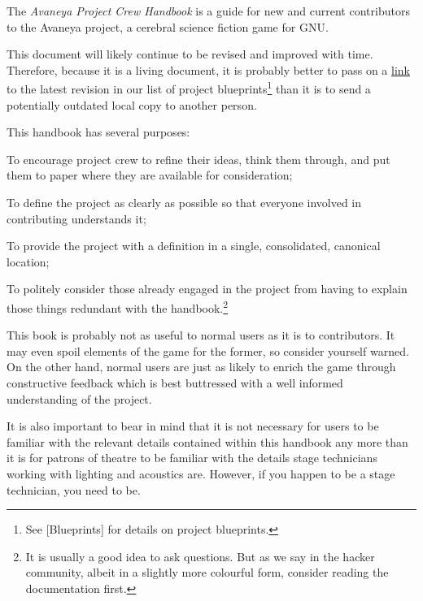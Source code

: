 

The {\it Avaneya Project Crew Handbook} is a guide for new and current contributors to the Avaneya project, a cerebral science fiction game for GNU. 

This document will likely continue to be revised and improved with time. Therefore, because it is a living document, it is probably better to pass on a \href{\LatestHandbookURL}{link} to the latest revision in our list of project blueprints\footnote[]{See [Blueprints] for details on project blueprints.} than it is to send a potentially outdated local copy to another person.

This handbook has several purposes:

\startitemize[4]
\item
To encourage project crew to refine their ideas, think them through, and put them to paper where they are available for consideration;

\item
To define the project as clearly as possible so that everyone involved in contributing understands it;

\item
To provide the project with a definition in a single, consolidated, canonical location;

\item
To politely consider those already engaged in the project from having to explain those things redundant with the handbook.\footnote[rtfm]{It is usually a good idea to ask questions. But as we say in the hacker community, albeit in a slightly more colourful form, consider reading the documentation first.}
\stopitemize

This book is probably not as useful to normal users as it is to contributors. It may even spoil elements of the game for the former, so consider yourself warned. On the other hand, normal users are just as likely to enrich the game through constructive feedback which is best buttressed with a well informed understanding of the project.

It is also important to bear in mind that it is not necessary for users to be familiar with the relevant details contained within this handbook any more than it is for patrons of theatre to be familiar with the details stage technicians working with lighting and acoustics are. However, if you happen to be a stage technician, you need to be.

\StopChapter

